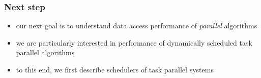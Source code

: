 \documentclass[12pt,dvipdfmx]{beamer}
\newcommand{\ao}[1]{{\color{blue}#1}}
\begin{document}
\begin{frame}
\frametitle{Next step}
\begin{itemize}
\item our next goal is to understand data access 
  performance of \ao{\em parallel} algorithms

\item we are particularly interested in
  performance of dynamically scheduled task
  parallel algorithms

\item to this end, we first describe schedulers
  of task parallel systems
\end{itemize}
\end{frame}
\end{document}
